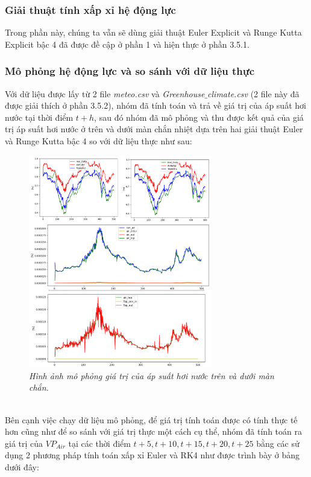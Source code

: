 \documentclass[13pt,a4paper]{article}
\begin{document}
			\subsubsection{Giải thuật tính xấp xỉ hệ động lực}
				Trong phần này, chúng ta vẫn sẽ dùng giải thuật Euler Explicit và Runge Kutta Explicit bậc 4 đã được đề cập ở phần 1 và hiện thực ở phần 3.5.1.
			\subsubsection{Mô phỏng hệ động lực và so sánh với dữ liệu thực}
				Với dữ liệu được lấy từ 2 file \textit{meteo.csv} và \textit{Greenhouse$\_$climate.csv} (2 file này đã được giải thích ở phần 3.5.2), nhóm đã tính toán và trả về giá trị của áp suất hơi nước tại thời điểm $t+h$, sau đó nhóm đã mô phỏng và thu được kết quả của giá trị áp suất hơi nước ở trên và dưới màn chắn nhiệt dựa trên hai giải thuật Euler và Runge Kutta bậc 4 so với dữ liệu thực như sau:
				\begin{figure}[h!]
					\begin{center}
						\includegraphics[width=8cm]{sim_h2o.png}
						\caption{\textit{Hình ảnh mô phỏng giá trị của áp suất hơi nước trên và dưới màn chắn.}}
						\label{h18}
					\end{center}
				\end{figure} \\
				Bên cạnh việc chạy dữ liệu mô phỏng, để giá trị tính toán được có tính thực tế hơn cũng như để so sánh với giá trị thực một cách cụ thể, nhóm đã tính toán ra giá trị của $VP_{Air}$ tại các thời điểm $t+5,t+10,t+15,t+20,t+25$ bằng các sử dụng 2 phương pháp tính toán xấp xỉ Euler và RK4 như được trình bày ở bảng dưới đây:
\end{document}
